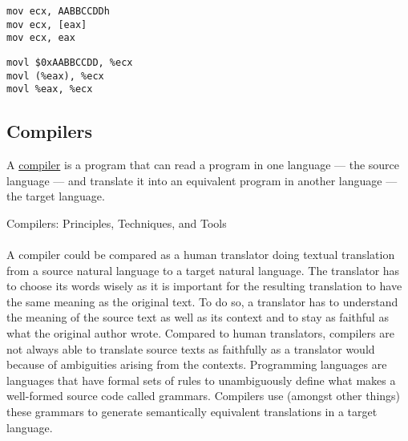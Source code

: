 \noindent\begin{minipage}{.45\textwidth}
	\begin{lstlisting}[caption={Equivalent of Listing~\ref{lst:intel_vs_att_2} using the Intel syntax.}, label={lst:intel_vs_att_1}, frame=tlrb, language={[x86masm]Assembler}]
mov ecx, AABBCCDDh
mov ecx, [eax]
mov ecx, eax
	\end{lstlisting}
\end{minipage}\hfill
\begin{minipage}{.45\textwidth}
	\begin{lstlisting}[caption={Equivalent of Listing~\ref{lst:intel_vs_att_1} using the AT\&T syntax.}, label={lst:intel_vs_att_2}, frame=tlrb, language={[x86masm]Assembler}]
movl $0xAABBCCDD, %ecx
movl (%eax), %ecx
movl %eax, %ecx
	\end{lstlisting}
\end{minipage}

\subsection{Compilers} \label{sec:compilers}

\begin{framed}
	\begin{definition}
		A \underline{compiler} is a program that can read a program in one language --- the source language --- and translate it into an equivalent program in another language --- the target language.
		\begin{flushright}
			\hfill{}{Compilers: Principles, Techniques, and Tools~\cite{Aho:2006:CPT:1177220}}
		\end{flushright}
	\end{definition}
\end{framed}

\paragraph{}
A compiler could be compared as a human translator doing textual translation from a source natural language to a target natural language. The translator has to choose its words wisely as it is important for the resulting translation to have the same meaning as the original text. To do so, a translator has to understand the meaning of the source text as well as its context and to stay as faithful as what the original author wrote. Compared to human translators, compilers are not always able to translate source texts as faithfully as a translator would because of ambiguities arising from the contexts. Programming languages are languages that have formal sets of rules to unambiguously define what makes a well-formed source code called grammars. Compilers use (amongst other things) these grammars to generate semantically equivalent translations in a target language.

